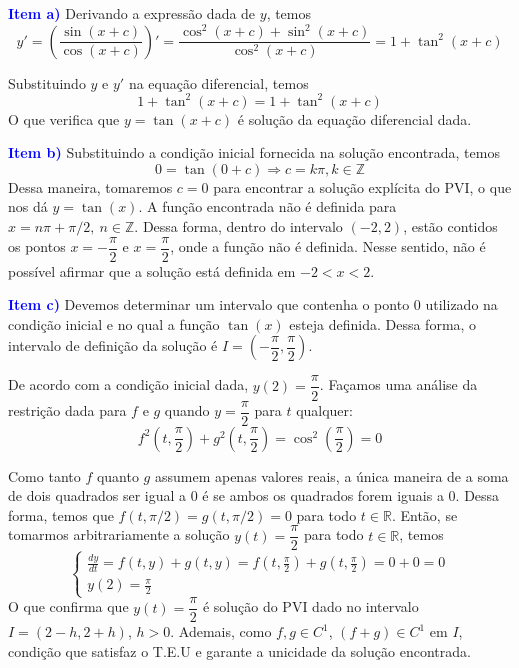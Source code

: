 \documentclass[oneside,12pt,a4paper]{report}
\begin{document}
        \begin{tcolorbox}[enhanced, breakable, colback=blue!1!white,colframe=blue!75!black,title=\textbf{\hyperlink{quest:ex8}{\hypertarget{resp:ex8}{Exercício 8}}}]

        \noindent\textcolor{blue}{\textbf{Item a)}} Derivando a expressão dada de $y$, temos
        \[y' = \left(\frac{\sin(x+c)}{\cos(x+c)}\right)'=\frac{\cos^2(x+c)+\sin^2(x+c)}{\cos^2(x+c)}=1+\tan^2(x+c)\]

        \noindent Substituindo $y$ e $y'$ na equação diferencial, temos
        \[1+\tan^2(x+c) = 1 + \tan^2(x+c)\]
        \noindent O que verifica que $y=\tan(x+c)$ é solução da equação diferencial dada.

        \noindent\textcolor{blue}{\textbf{Item b)}} Substituindo a condição inicial fornecida na solução encontrada, temos
        \[0 = \tan(0+c) \Rightarrow c = k\pi, k\in\mathbb{Z}\]
        \noindent Dessa maneira, tomaremos $c=0$ para encontrar a solução explícita do PVI, o que nos dá $y=\tan(x)$. A função encontrada não é definida para $x=n\pi+\pi/2,~n\in\mathbb{Z}$. Dessa forma, dentro do intervalo $(-2,2)$, estão contidos os pontos $x=-\dfrac{\pi}{2}$ e $x=\dfrac{\pi}{2}$, onde a função não é definida. Nesse sentido, não é possível afirmar que a solução está definida em $-2<x<2$.

        \noindent\textcolor{blue}{\textbf{Item c)}} Devemos determinar um intervalo que contenha o ponto $0$ utilizado na condição inicial e no qual a função $\tan(x)$ esteja definida. Dessa forma, o intervalo de definição da solução é $I=\left(-\dfrac{\pi}{2}, \dfrac{\pi}{2}\right)$.

        \end{tcolorbox}

        \begin{tcolorbox}[enhanced, breakable, colback=blue!1!white,colframe=blue!75!black,title=\textbf{\hyperlink{quest:ex9}{\hypertarget{resp:ex9}{Exercício 9}}}]
        \noindent De acordo com a condição inicial dada, $y(2)=\dfrac{\pi}{2}$. Façamos uma análise da restrição dada para $f$ e $g$ quando $y=\dfrac{\pi}{2}$ para $t$ qualquer:
        \[
        f^2\left(t, \frac{\pi}{2}\right) + g^2\left(t, \frac{\pi}{2}\right) = \cos^2\left(\frac{\pi}{2}\right) = 0 
        \]

        \noindent Como tanto $f$ quanto $g$ assumem apenas valores reais, a única maneira de a soma de dois quadrados ser igual a $0$ é se ambos os quadrados forem iguais a $0$. Dessa forma, temos que $f(t, \pi/2)=g(t, \pi/2)=0$ para todo $t \in \mathbb{R}$. Então, se tomarmos arbitrariamente a solução $y(t)=\dfrac{\pi}{2}$ para todo $t \in \mathbb{R}$, temos
        \[\begin{cases}\frac{dy}{dt} = f(t, y) + g(t, y) = f\left(t, \frac{\pi}{2}\right) + g\left(t, \frac{\pi}{2}\right) = 0+0 = 0\\
        y(2) = \frac{\pi}{2}
        \end{cases}\]
        \noindent O que confirma que $y(t)=\dfrac{\pi}{2}$ é solução do PVI dado no intervalo $I=(2-h,2+h)$, $h>0$. Ademais, como $f, g \in C^1$, $(f+g)\in C^1$ em $I$, condição que satisfaz o T.E.U e garante a unicidade da solução encontrada.
        \end{tcolorbox}
\end{document}
